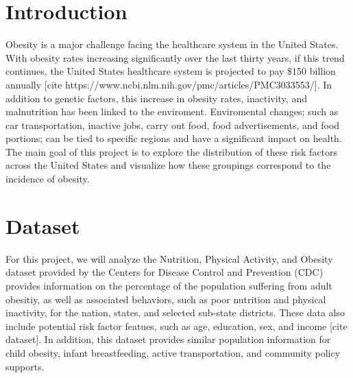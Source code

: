\documentclass{article}
\begin{document}
 



\section{Introduction}
\label{introduction}

Obesity is a major challenge facing the healthcare system in the United States. With obesity rates increasing significantly over the last thirty years, if this trend continues, the United States healthcare system is projected to pay \$150 billion annually [cite https://www.ncbi.nlm.nih.gov/pmc/articles/PMC3033553/].
In addition to genetic factors, this increase in obesity rates, inactivity, and malnutrition has been linked to the enviroment. 
Enviromental changes; such as car transportation, inactive jobs, carry out food, food advertisements, and food portions; can be tied to specific regions and have a significant impact on health. 
The main goal of this project is to explore the distribution of these risk factors across the United States and visualize how these groupings correspond to the incidence of obesity.

\section{Dataset}
\label{dataset}

For this project, we will analyze the Nutrition, Physical Activity, and Obesity dataset provided by the Centers for Disease Control and Prevention (CDC) provides information on the percentage of the population suffering from adult obesitiy, as well as associated behaviors, such as poor nutrition and physical inactivity, for the nation, states, and selected sub-state districts. These data also include potential risk factor featues, such as age, education, sex, and income [cite dataset].
In addition, this dataset provides similar population information for child obesity, infant breastfeeding, active transportation, and community policy supports.
\end{document}

